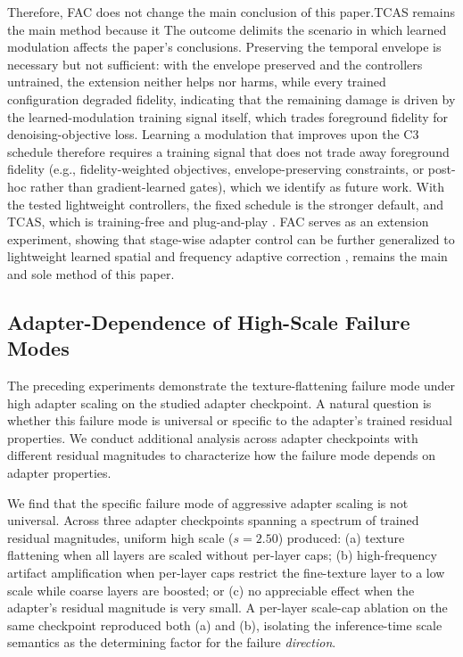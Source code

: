 \documentclass[times,twocolumn,final]{elsarticle}
\providecommand{\DIFadd}[1]{{\protect\color{blue} \sf #1}} %
\providecommand{\DIFdel}[1]{{\protect\color{red} \scriptsize #1}} %
\providecommand{\DIFaddbegin}{} %
\providecommand{\DIFaddend}{} %
\providecommand{\DIFdelbegin}{} %
\providecommand{\DIFdelend}{} %
\newcommand{\DIFscaledelfig}{0.5}
\newlength{\DIFdelgraphicswidth} %
\newlength{\DIFdelgraphicsheight} %
\newcommand{\DIFaddincludegraphics}[2][]{{\color{blue}\fbox{\DIFOincludegraphics[#1]{#2}}}} %
\newcommand{\DIFdelincludegraphics}[2][]{%
\sbox{\DIFdelgraphicsbox}{\DIFOincludegraphics[#1]{#2}}%
\settoboxwidth{\DIFdelgraphicswidth}{\DIFdelgraphicsbox} %
\settoboxtotalheight{\DIFdelgraphicsheight}{\DIFdelgraphicsbox} %
\scalebox{\DIFscaledelfig}{%
\parbox[b]{\DIFdelgraphicswidth}{\usebox{\DIFdelgraphicsbox}\\[-\baselineskip] \rule{\DIFdelgraphicswidth}{0em}}\llap{\resizebox{\DIFdelgraphicswidth}{\DIFdelgraphicsheight}{%
\setlength{\unitlength}{\DIFdelgraphicswidth}%
\begin{picture}(1,1)%
\thicklines\linethickness{2pt} %
{\color[rgb]{1,0,0}\put(0,0){\framebox(1,1){}}}%
{\color[rgb]{1,0,0}\put(0,0){\line( 1,1){1}}}%
{\color[rgb]{1,0,0}\put(0,1){\line(1,-1){1}}}%
\end{picture}%
}\hspace*{3pt}}} %
} %
\DeclareRobustCommand{\DIFaddbegin}{\DIFOaddbegin \let\includegraphics\DIFaddincludegraphics} %
\DeclareRobustCommand{\DIFaddend}{\DIFOaddend \let\includegraphics\DIFOincludegraphics} %
\DeclareRobustCommand{\DIFdelbegin}{\DIFOdelbegin \let\includegraphics\DIFdelincludegraphics} %
\DeclareRobustCommand{\DIFdelend}{\DIFOaddend \let\includegraphics\DIFOincludegraphics} %
\begin{document}
\DIFdelbegin \DIFdel{Therefore, FAC does not change the main conclusion of this paper.TCAS remains the main method because it }\DIFdelend \DIFaddbegin \DIFadd{The outcome delimits the scenario in which learned modulation affects the paper's conclusions. Preserving the temporal envelope is necessary but not sufficient: with the envelope preserved and the controllers untrained, the extension neither helps nor harms, while every trained configuration degraded fidelity, indicating that the remaining damage is driven by the learned-modulation training signal itself, which trades foreground fidelity for denoising-objective loss. Learning a modulation that improves upon the C3 schedule therefore requires a training signal that does not trade away foreground fidelity (e.g., fidelity-weighted objectives, envelope-preserving constraints, or post-hoc rather than gradient-learned gates), which we identify as future work. With the tested lightweight controllers, the fixed schedule is the stronger default, and TCAS, which }\DIFaddend is training-free and plug-and-play\DIFdelbegin \DIFdel{. FAC serves as an extension experiment, showing that stage-wise adapter control can be further generalized to lightweight learned spatial and frequency adaptive correction}\DIFdelend \DIFaddbegin \DIFadd{, remains the main and sole method of this paper}\DIFaddend .

\FloatBarrier

\subsection{Adapter-Dependence of High-Scale Failure Modes}
\label{subsec:adapterdep}

The preceding experiments demonstrate the texture-flattening failure mode under high adapter scaling on the studied adapter checkpoint. A natural question is whether this failure mode is universal or specific to the adapter's trained residual properties. We conduct additional analysis across adapter checkpoints with different residual magnitudes to characterize how the failure mode depends on adapter properties.

We find that the specific failure mode of aggressive adapter scaling is not universal. Across three adapter checkpoints spanning a spectrum of trained residual magnitudes, uniform high scale ($s = 2.50$) produced: (a) texture flattening when all layers are scaled without per-layer caps; (b) high-frequency artifact amplification when per-layer caps restrict the fine-texture layer to a low scale while coarse layers are boosted; or (c) no appreciable effect when the adapter's residual magnitude is very small. A per-layer scale-cap ablation on the same checkpoint reproduced both (a) and (b), isolating the inference-time scale semantics as the determining factor for the failure \emph{direction}.
\end{document}
